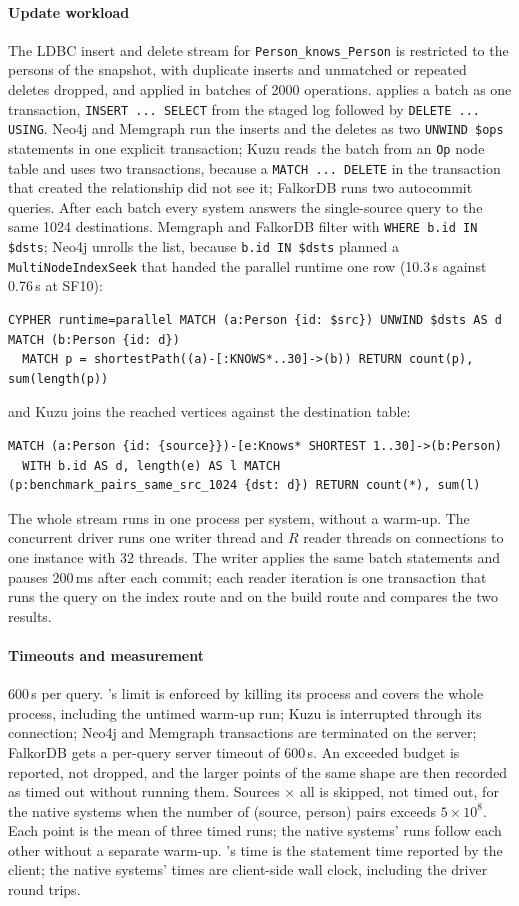 \paragraph{Update workload} The LDBC insert and delete stream for \texttt{Person\_knows\_Person} is restricted to the
persons of the snapshot, with duplicate inserts and unmatched or repeated deletes dropped, and applied in batches of
2000 operations. \duckdb applies a batch as one transaction, \texttt{INSERT ... SELECT} from the staged log followed by
\texttt{DELETE ... USING}. Neo4j and Memgraph run the inserts and the deletes as two \texttt{UNWIND \$ops} statements
in one explicit transaction; Kuzu reads the batch from an \texttt{Op} node table and uses two transactions, because a
\texttt{MATCH ... DELETE} in the transaction that created the relationship did not see it; FalkorDB runs two
autocommit queries. After each batch every system answers the single-source query to the same 1024 destinations.
Memgraph and FalkorDB filter with \texttt{WHERE b.id IN \$dsts}; Neo4j unrolls the list, because \texttt{b.id IN
\$dsts} planned a \texttt{MultiNodeIndexSeek} that handed the parallel runtime one row (10.3\,s against 0.76\,s at
SF10):
\begin{lstlisting}
CYPHER runtime=parallel MATCH (a:Person {id: $src}) UNWIND $dsts AS d MATCH (b:Person {id: d})
  MATCH p = shortestPath((a)-[:KNOWS*..30]->(b)) RETURN count(p), sum(length(p))
\end{lstlisting}
and Kuzu joins the reached vertices against the destination table:
\begin{lstlisting}
MATCH (a:Person {id: {source}})-[e:Knows* SHORTEST 1..30]->(b:Person)
  WITH b.id AS d, length(e) AS l MATCH (p:benchmark_pairs_same_src_1024 {dst: d}) RETURN count(*), sum(l)
\end{lstlisting}
The whole stream runs in one process per system, without a warm-up. The concurrent driver runs one writer thread and
$R$ reader threads on connections to one \duckdb instance with 32 threads. The writer applies the same batch
statements and pauses 200\,ms after each commit; each reader iteration is one transaction that runs the query on the
index route and on the build route and compares the two results.

\paragraph{Timeouts and measurement} 600\,s per query. \duckpgq's limit is enforced by killing its process and covers
the whole process, including the untimed warm-up run; Kuzu is interrupted through its connection; Neo4j and Memgraph
transactions are terminated on the server; FalkorDB gets a per-query server timeout of 600\,s. An exceeded budget is
reported, not dropped, and the larger points of the same shape are then recorded as timed out without running them.
Sources $\times$ all is skipped, not timed out, for the native systems when the number of (source, person) pairs
exceeds $5 \times 10^8$. Each point is the mean of three timed runs; the native systems' runs follow each other
without a separate warm-up. \duckpgq's time is the statement time reported by the \duckdb client; the native systems'
times are client-side wall clock, including the driver round trips.
